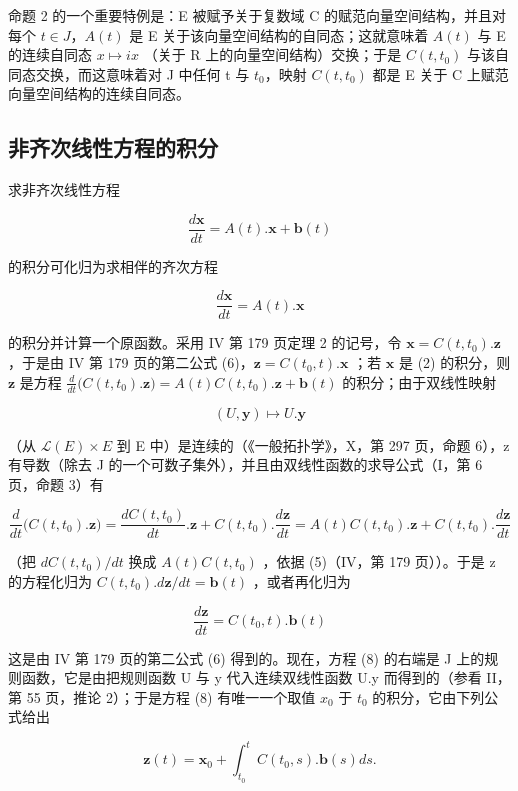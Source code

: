 命题 2 的一个重要特例是：E 被赋予关于复数域 C 的赋范向量空间结构，并且对每个 \(t \in J\)，\(A(t)\) 是 E 关于该向量空间结构的自同态；这就意味着 \(A(t)\) 与 E 的连续自同态 \(x \mapsto i x\) （关于 R 上的向量空间结构）交换；于是 \(C(t, t_{0})\) 与该自同态交换，而这意味着对 J 中任何 t 与 \(t_{0}\)，映射 \(C(t, t_{0})\) 都是 E 关于 C 上赋范向量空间结构的连续自同态。

\subsection{非齐次线性方程的积分}

求非齐次线性方程

\[
{\frac {d \mathbf {x}}{d t}} = A (t). \mathbf {x} + \mathbf {b} (t)\tag{2}
\]

的积分可化归为求相伴的齐次方程

\[
{\frac {d \mathbf {x}}{d t}} = A (t). \mathbf {x}\tag{4}
\]

的积分并计算一个原函数。采用 IV 第 179 页定理 2 的记号，令 \(\mathbf{x} = C(t, t_0).\mathbf{z}\) ，于是由 IV 第 179 页的第二公式 (6)，\(\mathbf{z} = C(t_0, t).\mathbf{x}\) ；若 \(\mathbf{x}\) 是 (2) 的积分，则 \(\mathbf{z}\) 是方程 \(\frac{d}{dt}\big(C(t, t_0).\mathbf{z}\big) = A(t)C(t, t_0).\mathbf{z} + \mathbf{b}(t)\) 的积分；由于双线性映射

\[
(U, \mathbf {y}) \mapsto U. \mathbf {y}
\]

（从 \(\mathcal{L}(E) \times E\) 到 E 中）是连续的（《一般拓扑学》，X，第 297 页，命题 6），z 有导数（除去 J 的一个可数子集外），并且由双线性函数的求导公式（I，第 6 页，命题 3）有

\[
\frac {d}{d t} \big (C (t, t _ {0}). \mathbf {z} \big) = \frac {d C (t , t _ {0})}{d t}. \mathbf {z} + C (t, t _ {0}). \frac {d \mathbf {z}}{d t} = A (t) C (t, t _ {0}). \mathbf {z} + C (t, t _ {0}). \frac {d \mathbf {z}}{d t}
\]

（把 \(dC(t, t_{0})/dt\) 换成 \(A(t)C(t, t_{0})\) ，依据 (5)（IV，第 179 页））。于是 z 的方程化归为 \(C(t, t_{0}).d\mathbf{z}/dt = \mathbf{b}(t)\) ，或者再化归为

\[
\frac {d \mathbf {z}}{d t} = C (t _ {0}, t). \mathbf {b} (t)\tag{8}
\]

这是由 IV 第 179 页的第二公式 (6) 得到的。现在，方程 (8) 的右端是 J 上的规则函数，它是由把规则函数 U 与 y 代入连续双线性函数 U.y 而得到的（参看 II，第 55 页，推论 2）；于是方程 (8) 有唯一一个取值 \(x_{0}\) 于 \(t_{0}\) 的积分，它由下列公式给出

\[
\mathbf {z} (t) = \mathbf {x} _ {0} + \int_ {t _ {0}} ^ {t} C (t _ {0}, s). \mathbf {b} (s) d s.\tag{9}
\]

